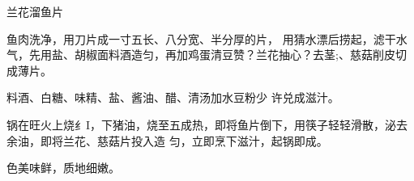 \begin{recipe}{兰花溜鱼片}

\ingredients



\cooking

\step 鱼肉洗净，用刀片成一寸五长、八分宽、半分厚的片，
用猜水漂后捞起，滤干水气，先用盐、胡椒面料酒造匀，再加鸡蛋清豆赞？兰花抽心？去茎;、慈菇削皮切成薄片。

\step 料酒、白糖、味精、盐、酱油、醋、清汤加水豆粉少
许兑成滋汁。

\step 锅在旺火上烧纟I，下猪油，烧至五成热，即将鱼片倒下，用筷子轻轻滑散，泌去余油，即将兰花、慈菇片投入造
匀，立即烹下滋汁，起锅即成。

\notes

色美味鲜，质地细嫩。

\end{recipe}


